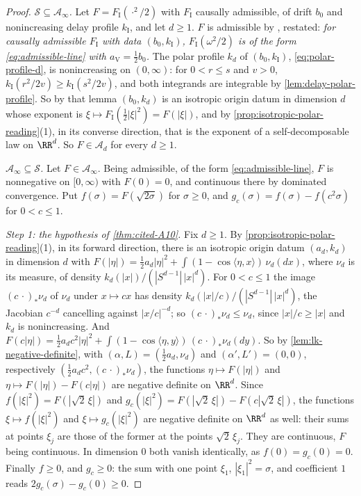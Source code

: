 \begin{proof}
\leanok
\emph{$\mathcal{S} \subseteq \mathcal{A}_\infty$.} Let $F = F_{\mathrm I}(\cdot^2/2)$ with
$F_{\mathrm I}$ causally admissible, of drift $b_0$ and nonincreasing delay profile
$k_{\mathrm I}$, and let $d \ge 1$. $F$ is admissible by , restated: \emph{for
causally admissible $F_{\mathrm I}$ with data $(b_0, k_{\mathrm I})$, $F_{\mathrm I}(\omega^2/2)$ is of
the form \ref{eq:admissible-line} with $a_{\mathrm V} = \tfrac12 b_0$.} The polar profile $k_d$
of $(b_0, k_{\mathrm I})$, \ref{eq:polar-profile-d}, is nonincreasing on $(0,\infty)$: for
$0 < r \le s$ and $v > 0$, $k_{\mathrm I}(r^2/2v) \ge k_{\mathrm I}(s^2/2v)$, and both integrands are
integrable by \ref{lem:delay-polar-profile}. So by that lemma $(b_0, k_d)$ is an isotropic origin
datum in dimension $d$ whose exponent is $\xi \mapsto F_{\mathrm I}(\tfrac12|\xi|^2) = F(|\xi|)$,
and by \ref{prop:isotropic-polar-reading}(1), in its converse direction, that is the exponent of a
self-decomposable law on $\RR^d$. So $F \in \mathcal{A}_d$ for every $d \ge 1$.

\emph{$\mathcal{A}_\infty \subseteq \mathcal{S}$.} Let $F \in \mathcal{A}_\infty$. Being admissible,
of the form \ref{eq:admissible-line}, $F$ is nonnegative on $[0,\infty)$ with $F(0) = 0$, and
continuous there by dominated convergence. Put
$f(\sigma) = F(\sqrt{2\sigma})$ for $\sigma \ge 0$, and $g_c(\sigma) = f(\sigma) - f(c^2\sigma)$ for
$0 < c \le 1$.

\emph{Step 1: the hypothesis of \ref{thm:cited-A10}.} Fix $d \ge 1$. By
\ref{prop:isotropic-polar-reading}(1), in its forward direction, there is an isotropic origin datum
$(a_d, k_d)$ in dimension $d$ with
$F(|\eta|) = \tfrac12 a_d|\eta|^2 + \int(1 - \cos\langle\eta,x\rangle)\,\nu_d(dx)$, where $\nu_d$ is
its \Levy{} measure, of density $k_d(|x|)/(|S^{d-1}|\,|x|^d)$. For $0 < c \le 1$ the image
$(c\,\cdot)_*\nu_d$ of $\nu_d$ under $x \mapsto cx$ has density $k_d(|x|/c)/(|S^{d-1}|\,|x|^d)$, the
Jacobian $c^{-d}$ cancelling against $|x/c|^{-d}$; so $(c\,\cdot)_*\nu_d \le \nu_d$, since
$|x|/c \ge |x|$ and $k_d$ is nonincreasing. And
$F(c|\eta|) = \tfrac12 a_dc^2|\eta|^2 + \int(1 - \cos\langle\eta,y\rangle)\,(c\,\cdot)_*\nu_d(dy)$.
So by \ref{lem:lk-negative-definite}, with $(\alpha, L) = (\tfrac12 a_d, \nu_d)$ and
$(\alpha', L') = (0, 0)$, respectively $(\tfrac12 a_dc^2, (c\,\cdot)_*\nu_d)$, the functions
$\eta \mapsto F(|\eta|)$ and $\eta \mapsto F(|\eta|) - F(c|\eta|)$ are negative definite on
$\RR^d$. Since $f(|\xi|^2) = F(|\sqrt2\,\xi|)$ and
$g_c(|\xi|^2) = F(|\sqrt2\,\xi|) - F(c|\sqrt2\,\xi|)$, the functions $\xi \mapsto f(|\xi|^2)$ and
$\xi \mapsto g_c(|\xi|^2)$ are negative definite on $\RR^d$ as well: their sums at points $\xi_j$
are those of the former at the points $\sqrt2\,\xi_j$. They are continuous, $F$ being continuous.
In dimension $0$ both vanish identically, as $f(0) = g_c(0) = 0$. Finally $f \ge 0$, and
$g_c \ge 0$: the sum with one point $\xi_1$, $|\xi_1|^2 = \sigma$, and coefficient $1$ reads
$2g_c(\sigma) - g_c(0) \ge 0$.


\end{proof}
